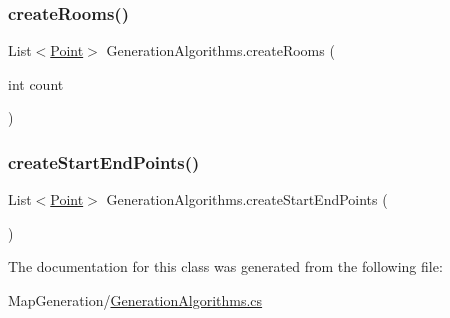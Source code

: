 \mbox{\label{class_generation_algorithms_a8f99868be40947066eac8896b3e6a445}} 
\subsubsection{\texorpdfstring{create\+Rooms()}{createRooms()}}
{\footnotesize\ttfamily List$<$\mbox{\hyperlink{class_point}{Point}}$>$ Generation\+Algorithms.\+create\+Rooms (\begin{DoxyParamCaption}\item[{int}]{count }\end{DoxyParamCaption})}

\mbox{\label{class_generation_algorithms_aa205e52cda5943e2f354ff8361445a08}} 
\subsubsection{\texorpdfstring{create\+Start\+End\+Points()}{createStartEndPoints()}}
{\footnotesize\ttfamily List$<$\mbox{\hyperlink{class_point}{Point}}$>$ Generation\+Algorithms.\+create\+Start\+End\+Points (\begin{DoxyParamCaption}{ }\end{DoxyParamCaption})}



The documentation for this class was generated from the following file\+:\begin{DoxyCompactItemize}
\item 
Map\+Generation/\mbox{\hyperlink{_generation_algorithms_8cs}{Generation\+Algorithms.\+cs}}\end{DoxyCompactItemize}
